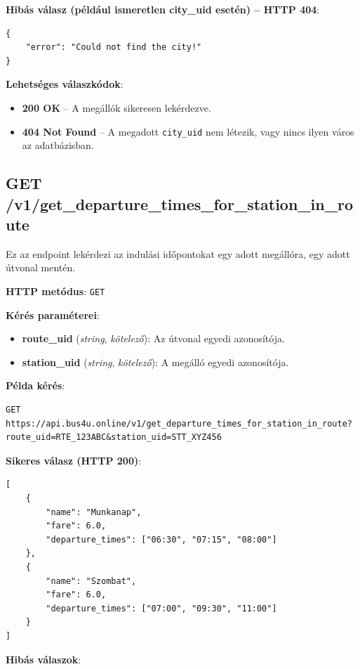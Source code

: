 \textbf{Hibás válasz (például ismeretlen city\_uid esetén) – HTTP 404}:
\begin{verbatim}
{
    "error": "Could not find the city!"
}
\end{verbatim}

\textbf{Lehetséges válaszkódok}:
\begin{itemize}
    \item \textbf{200 OK} – A megállók sikeresen lekérdezve.
    \item \textbf{404 Not Found} – A megadott \texttt{city\_uid} nem létezik, vagy nincs ilyen város az adatbázisban.
\end{itemize}

\subsection{GET /v1/get\_departure\_times\_for\_station\_in\_route}
Ez az endpoint lekérdezi az indulási időpontokat egy adott megállóra, egy adott útvonal mentén.

\textbf{HTTP metódus}: \verb|GET|

\textbf{Kérés paraméterei}:
\begin{itemize}
    \item \textbf{route\_uid} (\textit{string}, \textit{kötelező}): Az útvonal egyedi azonosítója.
    \item \textbf{station\_uid} (\textit{string}, \textit{kötelező}): A megálló egyedi azonosítója.
\end{itemize}

\textbf{Példa kérés}:
\begin{verbatim}
GET https://api.bus4u.online/v1/get_departure_times_for_station_in_route?
route_uid=RTE_123ABC&station_uid=STT_XYZ456
\end{verbatim}

\textbf{Sikeres válasz (HTTP 200)}:
\begin{verbatim}
[
    {
        "name": "Munkanap",
        "fare": 6.0,
        "departure_times": ["06:30", "07:15", "08:00"]
    },
    {
        "name": "Szombat",
        "fare": 6.0,
        "departure_times": ["07:00", "09:30", "11:00"]
    }
]
\end{verbatim}

\textbf{Hibás válaszok}:

